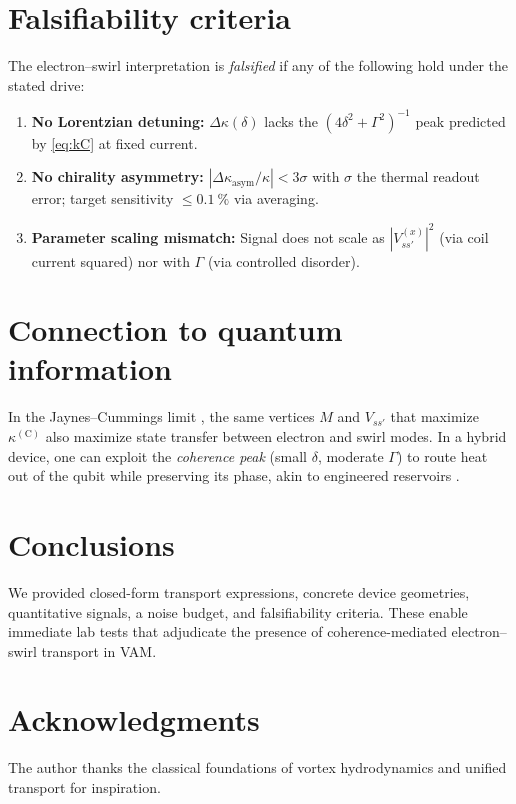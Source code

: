 \documentclass[12pt]{article}
\begin{document}
\section{Falsifiability criteria}
The electron--swirl interpretation is \emph{falsified} if any of the following hold under the stated drive:
\begin{enumerate}
  \item \textbf{No Lorentzian detuning:} $\Delta\kappa(\delta)$ lacks the $(4\delta^2+\Gamma^2)^{-1}$ peak predicted by \eqref{eq:kC} at fixed current.
  \item \textbf{No chirality asymmetry:} $|\Delta\kappa_\text{asym}/\kappa| < 3\sigma$ with $\sigma$ the thermal readout error; target sensitivity $\le\SI{0.1}{\percent}$ via averaging.
  \item \textbf{Parameter scaling mismatch:} Signal does not scale as $|V^{(x)}_{ss'}|^2$ (via coil current squared) nor with $\Gamma$ (via controlled disorder).
\end{enumerate}


\section{Connection to quantum information}
In the Jaynes--Cummings limit \cite{Jaynes1963}, the same vertices $M$ and $V_{ss'}$ that maximize $\kappa^{(\mathrm C)}$ also maximize state transfer between electron and swirl modes. In a hybrid device, one can exploit the \emph{coherence peak} (small $\delta$, moderate $\Gamma$) to route heat out of the qubit while preserving its phase, akin to engineered reservoirs \cite{Breuer2002,Aspelmeyer2014}.


\section{Conclusions}
We provided closed-form transport expressions, concrete device geometries, quantitative signals, a noise budget, and falsifiability criteria. These enable immediate lab tests that adjudicate the presence of coherence-mediated electron--swirl transport in VAM.


\section*{Acknowledgments}
The author thanks the classical foundations of vortex hydrodynamics and unified transport \cite{Madelung1927,Peierls1929,AllenFeldman1993,Simoncelli2019Unified} for inspiration.
\end{document}
